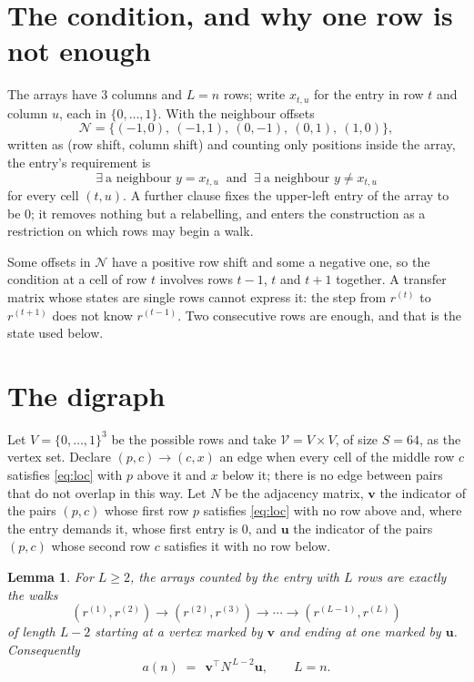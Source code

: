 \documentclass[11pt,a4paper]{article}
\theoremstyle{plain}
\newtheorem{lemma}[theorem]{Lemma}
\theoremstyle{definition}
\begin{document}
\section{The condition, and why one row is not enough}

The arrays have $3$ columns and $L=n$ rows; write $x_{t,u}$ for the entry in
row $t$ and column $u$, each in $\{0,\dots,1\}$. With the neighbour offsets
\[
\mathcal N=\{(-1,0),\ (-1,1),\ (0,-1),\ (0,1),\ (1,0)\},
\]
written as (row shift, column shift) and counting only positions inside the array, the
entry's requirement is
\begin{equation}\label{eq:loc}
\exists\ \text{a neighbour }y=x_{t,u}\ \text{ and }\ \exists\ \text{a neighbour }y\ne x_{t,u}
\end{equation}
for every cell $(t,u)$. A further clause fixes the upper-left entry of the array to be $0$; it removes nothing but a relabelling, and enters the construction as a restriction on which rows may begin a walk.

Some offsets in $\mathcal N$ have a positive row shift and some a negative one, so the
condition at a cell of row $t$ involves rows $t-1$, $t$ and $t+1$ together. A transfer
matrix whose states are single rows cannot express it: the step from $r^{(t)}$ to
$r^{(t+1)}$ does not know $r^{(t-1)}$. Two consecutive rows are enough, and that is
the state used below.

\section{The digraph}

Let $V=\{0,\dots,1\}^{3}$ be the possible rows and take
$\mathcal V=V\times V$, of size $S=64$, as the vertex set. Declare $(p,c)\to(c,x)$ an edge
when every cell of the middle row $c$ satisfies \eqref{eq:loc} with $p$ above it and $x$
below it; there is no edge between pairs that do not overlap in this way. Let $N$ be the
adjacency matrix, $\mathbf{v}$ the indicator of the pairs $(p,c)$ whose first row $p$
satisfies \eqref{eq:loc} with no row above and, where the entry demands it, whose first entry is $0$, and $\mathbf{u}$ the indicator of
the pairs $(p,c)$ whose second row $c$ satisfies it with no row below.

\begin{lemma}\label{lem:walk}
For $L\ge2$, the arrays counted by the entry with $L$ rows are exactly the walks
\[
(r^{(1)},r^{(2)})\to(r^{(2)},r^{(3)})\to\cdots\to(r^{(L-1)},r^{(L)})
\]
of length $L-2$ starting at a vertex marked by $\mathbf{v}$ and ending at one marked by
$\mathbf{u}$. Consequently
\[
a(n)\;=\;\,\mathbf{v}^{\!\top}N^{\,L-2}\mathbf{u},\qquad L=n .
\]
\end{lemma}
\end{document}
